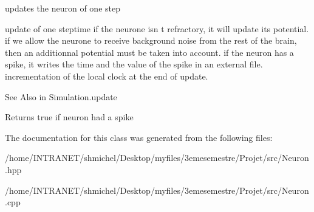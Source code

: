 updates the neuron of one step 

update of one steptime if the neurone isn t refractory, it will update its potential. if we allow the neurone to receive background noise from the rest of the brain, then an additionnal potential must be taken into account. if the neuron has a spike, it writes the time and the value of the spike in an external file. incrementation of the local clock at the end of update. \begin{DoxySeeAlso}{See Also}
in Simulation.\-update 
\end{DoxySeeAlso}
\begin{DoxyReturn}{Returns}
true if neuron had a spike 
\end{DoxyReturn}


The documentation for this class was generated from the following files\-:\begin{DoxyCompactItemize}
\item 
/home/\-I\-N\-T\-R\-A\-N\-E\-T/shmichel/\-Desktop/myfiles/3emesemestre/\-Projet/src/Neuron.\-hpp\item 
/home/\-I\-N\-T\-R\-A\-N\-E\-T/shmichel/\-Desktop/myfiles/3emesemestre/\-Projet/src/Neuron.\-cpp\end{DoxyCompactItemize}
